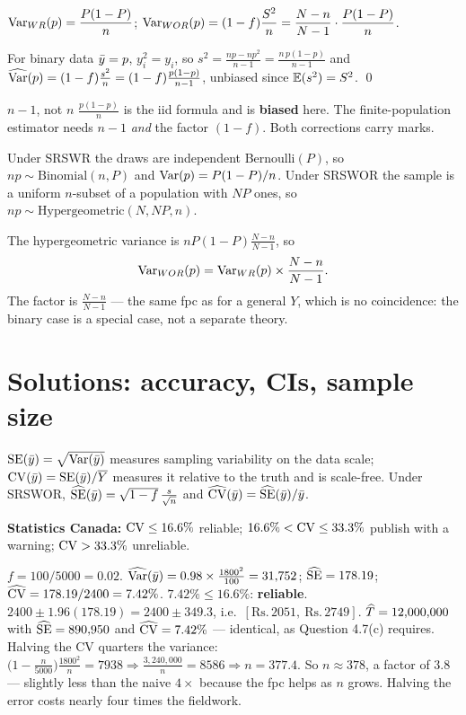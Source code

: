  $\operatorname{Var}_{WR}(p)=\dfrac{P(1-P)}{n}$;
$\operatorname{Var}_{WOR}(p)=(1-f)\dfrac{S^2}{n}=\dfrac{N-n}{N-1}\cdot\dfrac{P(1-P)}{n}$.

 For binary data $\bar{y}=p$, $y_i^2=y_i$, so
$s^2=\frac{np-np^2}{n-1}=\frac{n\,p(1-p)}{n-1}$ and
$\widehat{\operatorname{Var}}(p)=(1-f)\frac{s^2}{n}=(1-f)\frac{p(1-p)}{n-1}$, unbiased since $\mathbb{E}(s^2)=S^2$. \qed

\begin{trap}{$n-1$, not $n$}
$\frac{p(1-p)}{n}$ is the iid formula and is \textbf{biased} here. The finite-population
estimator needs $n-1$ \emph{and} the factor $(1-f)$. Both corrections carry marks.
\end{trap}

 Under SRSWR the draws are independent Bernoulli$(P)$, so
$np\sim\text{Binomial}(n,P)$ and $\operatorname{Var}(p)=P(1-P)/n$. Under SRSWOR the sample is a uniform
$n$-subset of a population with $NP$ ones, so $np\sim\text{Hypergeometric}(N,NP,n)$.

 The hypergeometric variance is $nP(1-P)\frac{N-n}{N-1}$, so
\[
  \operatorname{Var}_{WOR}(p)=\operatorname{Var}_{WR}(p)\times\frac{N-n}{N-1}.
\]
The factor is $\frac{N-n}{N-1}$ --- the same fpc as for a general $Y$, which is no coincidence:
the binary case is a special case, not a separate theory.

\section{Solutions: accuracy, CIs, sample size}
\setcounter{qq}{0}

\sol $\operatorname{SE}(\bar{y})=\sqrt{\operatorname{Var}(\bar{y})}$ measures sampling variability on the data scale;
$\operatorname{CV}(\bar{y})=\operatorname{SE}(\bar{y})/\overline{Y}$ measures it relative to the truth and is scale-free. Under SRSWOR,
$\widehat{\operatorname{SE}}(\bar{y})=\sqrt{1-f}\,\frac{s}{\sqrt n}$ and $\widehat{\operatorname{CV}}(\bar{y})=\widehat{\operatorname{SE}}(\bar{y})/\bar{y}$.

\textbf{Statistics Canada:} $\operatorname{CV}\le16.6\%$ reliable; $16.6\%<\operatorname{CV}\le33.3\%$ publish with a
warning; $\operatorname{CV}>33.3\%$ unreliable.

\sol $f=100/5000=0.02$.
 $\widehat{\operatorname{Var}}(\bar{y})=0.98\times\frac{1800^2}{100}=31{,}752$;
$\widehat{\operatorname{SE}}=178.19$; $\widehat{\operatorname{CV}}=178.19/2400=7.42\%$.
 $7.42\%\le16.6\%$: \textbf{reliable}.
 $2400\pm1.96(178.19)=2400\pm349.3$, i.e.\ $[\text{Rs.}\,2051,\ \text{Rs.}\,2749]$.
 $\widehat{T}=12{,}000{,}000$ with $\widehat{\operatorname{SE}}=890{,}950$ and $\widehat{\operatorname{CV}}=7.42\%$ --- identical, as
Question 4.7(c) requires.
 Halving the CV quarters the variance:
$\big(1-\frac{n}{5000}\big)\frac{1800^2}{n}=7938\Rightarrow\frac{3{,}240{,}000}{n}=8586\Rightarrow n=377.4$.
So $n\approx378$, a factor of $3.8$ --- slightly less than the naive $4\times$ because the fpc
helps as $n$ grows. Halving the error costs nearly four times the fieldwork.

